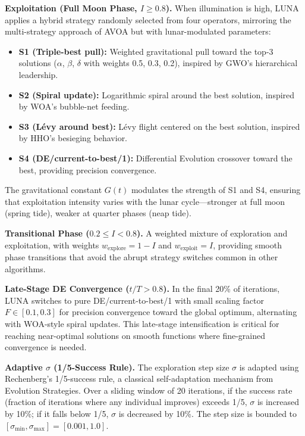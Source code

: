 \documentclass[11pt,a4paper]{article}
\begin{document}
\textbf{Exploitation (Full Moon Phase, $I \geq 0.8$).} When illumination is high, LUNA applies a hybrid strategy randomly selected from four operators, mirroring the multi-strategy approach of AVOA but with lunar-modulated parameters:
\begin{itemize}[leftmargin=1.5em]
\item \textbf{S1 (Triple-best pull):} Weighted gravitational pull toward the top-3 solutions ($\alpha$, $\beta$, $\delta$ with weights 0.5, 0.3, 0.2), inspired by GWO's hierarchical leadership.
\item \textbf{S2 (Spiral update):} Logarithmic spiral around the best solution, inspired by WOA's bubble-net feeding.
\item \textbf{S3 (L\'evy around best):} L\'evy flight centered on the best solution, inspired by HHO's besieging behavior.
\item \textbf{S4 (DE/current-to-best/1):} Differential Evolution crossover toward the best, providing precision convergence.
\end{itemize}
The gravitational constant $G(t)$ modulates the strength of S1 and S4, ensuring that exploitation intensity varies with the lunar cycle---stronger at full moon (spring tide), weaker at quarter phases (neap tide).

\textbf{Transitional Phase ($0.2 \leq I < 0.8$).} A weighted mixture of exploration and exploitation, with weights $w_{\text{explore}} = 1 - I$ and $w_{\text{exploit}} = I$, providing smooth phase transitions that avoid the abrupt strategy switches common in other algorithms.

\textbf{Late-Stage DE Convergence ($t/T > 0.8$).} In the final 20\% of iterations, LUNA switches to pure DE/current-to-best/1 with small scaling factor $F \in [0.1, 0.3]$ for precision convergence toward the global optimum, alternating with WOA-style spiral updates. This late-stage intensification is critical for reaching near-optimal solutions on smooth functions where fine-grained convergence is needed.

\textbf{Adaptive $\sigma$ (1/5-Success Rule).} The exploration step size $\sigma$ is adapted using Rechenberg's 1/5-success rule, a classical self-adaptation mechanism from Evolution Strategies. Over a sliding window of 20 iterations, if the success rate (fraction of iterations where any individual improves) exceeds 1/5, $\sigma$ is increased by 10\%; if it falls below 1/5, $\sigma$ is decreased by 10\%. The step size is bounded to $[\sigma_{\min}, \sigma_{\max}] = [0.001, 1.0]$.
\end{document}
